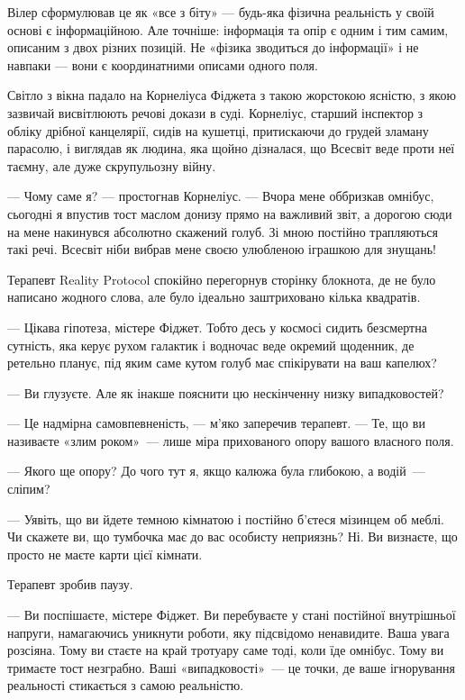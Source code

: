 \documentclass[12pt, a4paper, openany]{book}
\begin{document}
Вілер сформулював це як «все з біту» --- будь-яка фізична реальність у своїй основі є інформаційною. Але точніше: інформація та опір є одним і тим самим, описаним з двох різних позицій. Не «фізика зводиться до інформації» і не навпаки --- вони є координатними описами одного поля.


\begin{realitybox}
Світло з вікна падало на Корнеліуса Фіджета з такою жорстокою ясністю, з якою зазвичай висвітлюють речові докази в суді. Корнеліус, старший інспектор з обліку дрібної канцелярії, сидів на кушетці, притискаючи до грудей зламану парасолю, і виглядав як людина, яка щойно дізналася, що Всесвіт веде проти неї таємну, але дуже скрупульозну війну.

--- Чому саме я? --- простогнав Корнеліус. --- Вчора мене оббризкав омнібус, сьогодні я впустив тост маслом донизу прямо на важливий звіт, а дорогою сюди на мене накинувся абсолютно скажений голуб. Зі мною постійно трапляються такі речі. Всесвіт ніби вибрав мене своєю улюбленою іграшкою для знущань!

\medskip
Терапевт Reality Protocol спокійно перегорнув сторінку блокнота, де не було написано жодного слова, але було ідеально заштриховано кілька квадратів.

--- Цікава гіпотеза, містере Фіджет. Тобто десь у космосі сидить безсмертна сутність, яка керує рухом галактик і водночас веде окремий щоденник, де ретельно планує, під яким саме кутом голуб має спікірувати на ваш капелюх?

--- Ви глузуєте. Але як інакше пояснити цю нескінченну низку випадковостей?

--- Це надмірна самовпевненість, --- м'яко заперечив терапевт. --- Те, що ви називаєте «злим роком»~--- лише міра прихованого опору вашого власного поля.

--- Якого ще опору? До чого тут я, якщо калюжа була глибокою, а водій~--- сліпим?

--- Уявіть, що ви йдете темною кімнатою і постійно б'єтеся мізинцем об меблі. Чи скажете ви, що тумбочка має до вас особисту неприязнь? Ні. Ви визнаєте, що просто не маєте карти цієї кімнати.

\medskip
Терапевт зробив паузу.

--- Ви поспішаєте, містере Фіджет. Ви перебуваєте у стані постійної внутрішньої напруги, намагаючись уникнути роботи, яку підсвідомо ненавидите. Ваша увага розсіяна. Тому ви стаєте на край тротуару саме тоді, коли їде омнібус. Тому ви тримаєте тост незграбно. Ваші «випадковості»~--- це точки, де ваше ігнорування реальності стикається з самою реальністю.


\end{realitybox}
\end{document}
